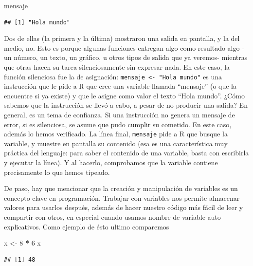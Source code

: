 \documentclass[spanish,]{book}
\newenvironment{Shaded}{\begin{snugshade}}{\end{snugshade}}
\newcommand{\DecValTok}[1]{\textcolor[rgb]{0.00,0.00,0.81}{#1}}
\newcommand{\NormalTok}[1]{#1}
\newcommand{\OperatorTok}[1]{\textcolor[rgb]{0.81,0.36,0.00}{\textbf{#1}}}
\newcommand{\StringTok}[1]{\textcolor[rgb]{0.31,0.60,0.02}{#1}}
\begin{document}
\begin{Shaded}
\begin{Highlighting}[]
\NormalTok{mensaje}
\end{Highlighting}
\end{Shaded}

\begin{verbatim}
## [1] "Hola mundo"
\end{verbatim}

Dos de ellas (la primera y la última) mostraron una salida en pantalla, y la del medio, no. Esto es porque algunas funciones entregan algo como resultado algo -un número, un texto, un gráfico, u otros tipos de salida que ya veremos- mientras que otras hacen su tarea silenciosamente sin expresar nada. En este caso, la función silenciosa fue la de asignación: \texttt{mensaje\ \textless{}-\ "Hola\ mundo"} es una instrucción que le pide a R que cree una variable llamada ``mensaje'' (o que la encuentre si ya existe) y que le asigne como valor el texto ``Hola mundo''. ¿Cómo sabemos que la instrucción se llevó a cabo, a pesar de no producir una salida? En general, es un tema de confianza. Si una instrucción no genera un mensaje de error, si es silenciosa, se asume que pudo cumplir su cometido. En este caso, además lo hemos verificado. La línea final, \texttt{mensaje} pide a R que busque la variable, y muestre en pantalla su contenido (esa es una característica muy práctica del lenguaje: para saber el contenido de una variable, basta con escribirla y ejecutar la línea). Y al hacerlo, comprobamos que la variable contiene precisamente lo que hemos tipeado.

De paso, hay que mencionar que la creación y manipulación de variables es un concepto clave en programación. Trabajar con variables nos permite almacenar valores para usarlos después, además de hacer nuestro código más fácil de leer y compartir con otros, en especial cuando usamos nombre de variable auto-explicativos. Como ejemplo de ésto ultimo comparemos

\begin{Shaded}
\begin{Highlighting}[]
\NormalTok{x <-}\StringTok{ }\DecValTok{8} \OperatorTok{*}\StringTok{ }\DecValTok{6}
\NormalTok{x}
\end{Highlighting}
\end{Shaded}

\begin{verbatim}
## [1] 48
\end{verbatim}
\end{document}
